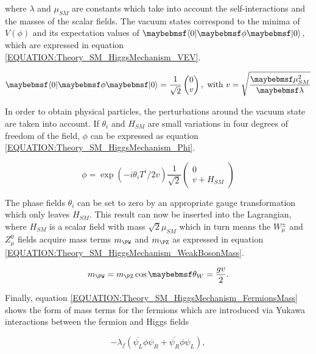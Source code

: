 where $\lambda$ and $\mu_{SM}$ are constants which take into account the self-interactions and the masses of the scalar fields. The vacuum states correspond to the minima of $V(\phi)$ and its expectation values of $\bra{0}\phi\ket{0}$, which are expressed in equation \ref{EQUATION:Theory_SM_HiggsMechanism_VEV}.

\begin{equation}
\bra{0}\phi\ket{0} = \frac{1}{\sqrt{2}} \begin{pmatrix}0 \\ v \end{pmatrix},\text{ with } v=\sqrt{\frac{\mu_{SM}^{2}}{\lambda}} 
\label{EQUATION:Theory_SM_HiggsMechanism_VEV}
\end{equation}

In order to obtain physical particles, the perturbations around the vacuum state are taken into account. If $\theta_{i}$ and $H_{SM}$ are small variations in four degrees of freedom of the field, $\phi$ can be expressed as equation \ref{EQUATION:Theory_SM_HiggsMechanism_Phi}.

\begin{equation}
\phi = \exp(-i\theta_{i}T^{i}/2v)\frac{1}{\sqrt{2}}\begin{pmatrix} 0 \\ v+H_{SM} \end{pmatrix}
\label{EQUATION:Theory_SM_HiggsMechanism_Phi}
\end{equation}

The phase fields $\theta_{i}$ can be set to zero by an appropriate gauge transformation which only leaves $H_{SM}$. This result can now be inserted into the Lagrangian, where $H_{SM}$ is a scalar field with mass $\sqrt{2}\mu_{SM}$ which in turn means the $W_{\mu}^{\pm}$ and $Z_{\mu}^{0}$ fields acquire mass terms $m_{\PW}$ and $m_{\PZ}$ as expressed in equation \ref{EQUATION:Theory_SM_HiggsMechanism_WeakBosonMass}.

\begin{equation}
m_{\PW} = m_{\PZ}\cos{\theta_{W}}=\frac{gv}{2}.
\label{EQUATION:Theory_SM_HiggsMechanism_WeakBosonMass}
\end{equation}

Finally, equation \ref{EQUATION:Theory_SM_HiggsMechanism_FermionsMass} shows the form of mass terms for the fermions which are introduced via Yukawa interactions between the fermion and Higgs fields

\begin{equation}
-\lambda_{f}( \overline{\psi_{L}}\phi\psi_{R} + \overline{\psi_{R}}\phi\psi_{L}),  
\label{EQUATION:Theory_SM_HiggsMechanism_FermionsMass}
\end{equation}

